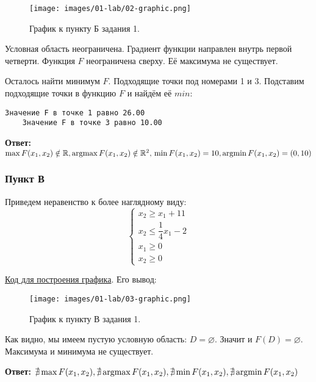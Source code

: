 \begin{figure}[H]
    \texttt{[image: images/01-lab/02-graphic.png]}
    \caption{График к пункту Б задания 1.}
    \label{01-lab-02-graphic}
\end{figure}

Условная область неограничена. Градиент функции направлен внутрь первой четверти. Функция $F$ неограничена сверху. Её максимума не существует.

Осталось найти минимум $F$. Подходящие точки под номерами 1 и 3. Подставим подходящие точки в функцию $F$ и найдём её $min$:

\begin{lstlisting}[language=text]
    Значение F в точке 1 равно 26.00
    Значение F в точке 3 равно 10.00
\end{lstlisting}

\textbf{Ответ:} $\max F(x_1, x_2) \notin \mathbb R, \operatorname*{argmax} F(x_1, x_2) \notin \mathbb R^2,\\
 \min F(x_1, x_2) = 10, \operatorname*{argmin} F(x_1, x_2) = (0, 10)$ \label{01-lab-b-answer}

\subsubsection{Пункт В}\label{01-lab-c}

Приведем неравенство к более наглядному виду:
\[
    \begin{cases}
        x_2 \geq x_1 + 11\\
        x_2 \leq \dfrac{1}{4}x_1 - 2\\
        x_1 \geq 0\\
        x_2 \geq 0
    \end{cases}
\]

\href{https://github.com/retrobannerS/optimization_methods/blob/main/python/01-lab/C.%2001.py}{Код для построения графика}. Его вывод:

\begin{figure}[H]
    \texttt{[image: images/01-lab/03-graphic.png]}
    \caption{График к пункту В задания 1.}
    \label{01-lab-03-graphic}
\end{figure}

Как видно, мы имеем пустую условную область: $D = \varnothing$. Значит и $F(D) = \varnothing$. Максимума и минимума не существует.

\textbf{Ответ:} $\nexists\max F(x_1, x_2), \nexists\operatorname*{argmax} F(x_1, x_2), \nexists\min F(x_1, x_2), \nexists\operatorname*{argmin} F(x_1, x_2)$ \label{01-lab-c-answer}

\newpage

